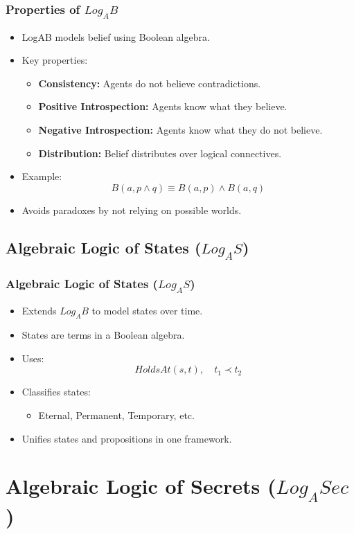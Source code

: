 \documentclass[aspectratio=169]{beamer}
\begin{document}
\begin{frame}
\frametitle{Properties of $Log_AB$}
\begin{itemize}
    \item LogAB models belief using Boolean algebra.
    \item Key properties:
    \begin{itemize}
        \item \textbf{Consistency:} Agents do not believe contradictions.
        \item \textbf{Positive Introspection:} Agents know what they believe.
        \item \textbf{Negative Introspection:} Agents know what they do not believe.
        \item \textbf{Distribution:} Belief distributes over logical connectives.
    \end{itemize}
    \item Example:
    \[
    B(a, p \wedge q) \equiv B(a, p) \wedge B(a, q)
    \]
    \item Avoids paradoxes by not relying on possible worlds.
\end{itemize}
\end{frame}

\subsection{Algebraic Logic of States ($Log_AS$)}
\begin{frame}
\frametitle{Algebraic Logic of States ($Log_AS$)}
\begin{itemize}
    \item Extends $Log_AB$ to model states over time.
    \item States are terms in a Boolean algebra.
    \item Uses:
    \[
    HoldsAt(s, t), \quad t_1 \prec t_2
    \]
    \item Classifies states:
    \begin{itemize}
        \item Eternal, Permanent, Temporary, etc.
    \end{itemize}
    \item Unifies states and propositions in one framework.
\end{itemize}
\end{frame}


\section{Algebraic Logic of Secrets ($Log_ASec$)}
\end{document}
